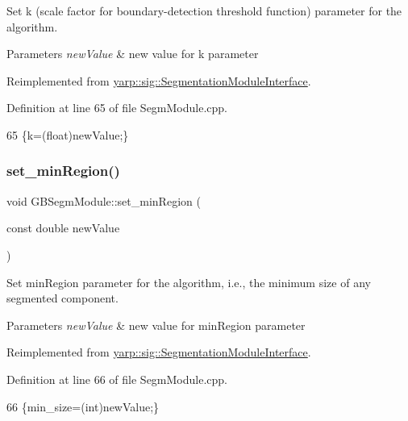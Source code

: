 Set k (scale factor for boundary-\/detection threshold function) parameter for the algorithm. 


\begin{DoxyParams}{Parameters}
{\em new\+Value} & new value for k parameter \\
\hline
\end{DoxyParams}


Reimplemented from \hyperlink{classyarp_1_1sig_1_1SegmentationModuleInterface_a2851eae0226ad68f41cd8b61d8bb1456}{yarp\+::sig\+::\+Segmentation\+Module\+Interface}.



Definition at line 65 of file Segm\+Module.\+cpp.


\begin{DoxyCode}
65 \{k=(float)newValue;\}
\end{DoxyCode}
\mbox{\label{classGBSegmModule_ae1c722c9c774cbde4f6bfada3f0826ba}} 
\subsubsection{\texorpdfstring{set\+\_\+min\+Region()}{set\_minRegion()}}
{\footnotesize\ttfamily void G\+B\+Segm\+Module\+::set\+\_\+min\+Region (\begin{DoxyParamCaption}\item[{const double}]{new\+Value }\end{DoxyParamCaption})\hspace{0.3cm}{\ttfamily [virtual]}}



Set min\+Region parameter for the algorithm, i.\+e., the minimum size of any segmented component. 


\begin{DoxyParams}{Parameters}
{\em new\+Value} & new value for min\+Region parameter \\
\hline
\end{DoxyParams}


Reimplemented from \hyperlink{classyarp_1_1sig_1_1SegmentationModuleInterface_ad9d90ed7e362ae83e2145445a9c4301e}{yarp\+::sig\+::\+Segmentation\+Module\+Interface}.



Definition at line 66 of file Segm\+Module.\+cpp.


\begin{DoxyCode}
66 \{min\_size=(int)newValue;\}
\end{DoxyCode}
\mbox{\label{classGBSegmModule_a27ffe08d394d321d9f9441423d36ef5e}} 
